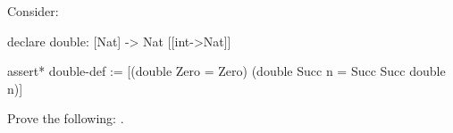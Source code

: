 %
%
Consider:
\begin{tcAthena}
declare double: [Nat] -> Nat [[int->Nat]]

assert* double-def := [(double Zero = Zero)
                       (double Succ n = Succ Succ double n)]
\end{tcAthena}
Prove the following: .
